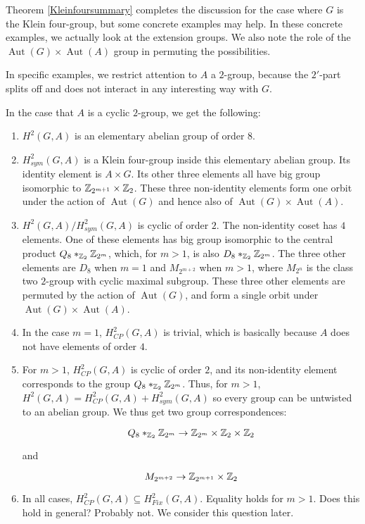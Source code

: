 \documentclass[10pt]{amsart}
\newcommand{\Aut}{\operatorname{Aut}}
\begin{document}
Theorem \ref{Kleinfoursummary} completes the discussion for the case
where $G$ is the Klein four-group, but some concrete examples may
help. In these concrete examples, we actually look at the extension
groups. We also note the role of the $\operatorname{Aut}(G) \times
\operatorname{Aut}(A)$ group in permuting the possibilities.

In specific examples, we restrict attention to $A$ a $2$-group,
because the $2'$-part splits off and does not interact in any
interesting way with $G$.

In the case that $A$ is a cyclic $2$-group, we get the following:

\begin{enumerate}
\item $H^2(G,A)$ is an elementary abelian group of order $8$.
\item $H^2_{sym}(G,A)$ is a Klein four-group inside this elementary
  abelian group. Its identity element is $A \times G$. Its other
  three elements all have big group isomorphic to $\mathbb{Z}_{2^{m+1}}
  \times \mathbb{Z}_2$. These three non-identity elements form one orbit
  under the action of $\Aut(G)$ and hence also of $\Aut(G) \times
  \Aut(A)$.
\item $H^2(G,A)/H^2_{sym}(G,A)$ is cyclic of order $2$. The
  non-identity coset has $4$ elements. One of these elements has big
  group isomorphic to the central product $Q_8 *_{\mathbb{Z}_2} \mathbb{Z}_{2^m}$,
  which, for $m > 1$, is also $D_8 *_{\mathbb{Z}_2} \mathbb{Z}_{2^m}$. The three other
  elements are $D_8$ when $m = 1$ and $M_{2^{m+2}}$ when $m > 1$,
  where $M_{2^n}$ is the class two $2$-group with cyclic maximal
  subgroup. These three other elements are permuted by the action of
  $\Aut(G)$, and form a single orbit under $\Aut(G) \times \Aut(A)$.
\item In the case $m = 1$, $H^2_{CP}(G,A)$ is trivial, which is
  basically because $A$ does not have elements of order $4$.
\item For $m > 1$, $H^2_{CP}(G,A)$ is cyclic of order $2$, and its
  non-identity element corresponds to the group $Q_8 *_{\mathbb{Z}_2}
  \mathbb{Z}_{2^m}$. Thus, for $m > 1$, $H^2(G,A) = H^2_{CP}(G,A) +
  H^2_{sym}(G,A)$ so every group can be untwisted to an abelian
  group. We thus get two group correspondences: 
    
  $$Q_8 *_{\mathbb{Z}_2} \mathbb{Z}_{2^m} \to \mathbb{Z}_{2^m} \times \mathbb{Z}_2 \times \mathbb{Z}_2$$
  
  and
  
  $$M_{2^{m + 2}} \to \mathbb{Z}_{2^{m+1}} \times \mathbb{Z}_2$$
\item In all cases, $H^2_{CP}(G,A) \subseteq H^2_{Fix}(G,A)$. Equality
  holds for $m > 1$. Does this hold in general? Probably not. We
  consider this question later.
\end{enumerate}
\end{document}
